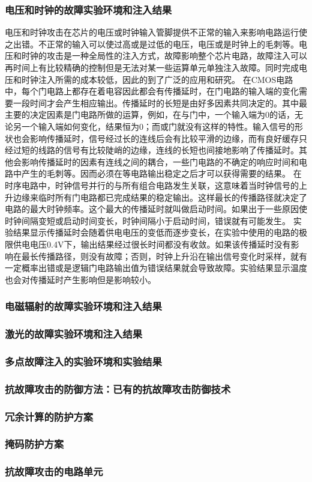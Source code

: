 \documentclass[a4paper,12pt]{article}
\begin{document}
\begin{CJK}{UTF8}{gkai}
\subsubsection{电压和时钟的故障实验环境和注入结果}

电压和时钟攻击在芯片的电压或时钟输入管脚提供不正常的输入来影响电路运行使之出错。不正常的输入可以使过高或是过低的电压，电压或是时钟上的毛刺等。电压和时钟的攻击是一种全局性的注入方式，故障影响整个芯片电路，故障注入可以再时间上有比较精确的控制但是无法对某一些运算单元单独注入故障。同时完成电压和时钟注入所需的成本较低，因此的到了广泛的应用和研究。
在CMOS电路中，每个门电路上都存在着电容因此都会有传播延时，在门电路的输入端的变化需要一段时间才会产生相应输出。传播延时的长短是由好多因素共同决定的。其中最主要的决定因素是门电路所做的运算，例如，在与门中，一个输入端为0的话，无论另一个输入端如何变化，结果恒为0；而或门就没有这样的特性。输入信号的形状也会影响传播延时，信号经过长的连线后会有比较平滑的边缘，而有良好缓存只经过短的线路的信号有比较陡峭的边缘，连线的长短也间接地影响了传播延时。其他会影响传播延时的因素有连线之间的耦合，一些门电路的不确定的响应时间和电路中产生的毛刺等。因而必须在等电路输出稳定之后才可以获得需要的结果。
在时序电路中，时钟信号并行的与所有组合电路发生关联，这意味着当时钟信号的上升边缘来临时所有门电路都已完成结果的稳定输出。这样最长的传播路径就决定了电路的最大时钟频率。这个最大的传播延时就叫做启动时间。如果出于一些原因使时钟间隔变短或启动时间变长，时钟间隔小于启动时间，错误就有可能发生。
实验结果显示传播延时会随着供电电压的变低而逐步变长，在实验中使用的电路的极限供电电压0.4V下，输出结果经过很长时间都没有收敛。如果该传播延时没有影响在最长传播路径，则没有故障；否则，时钟上升沿在输出信号变化时采样，就有一定概率出错或是逻辑门电路输出值为错误结果就会导致故障。实验结果显示温度也会对传播延时产生影响但是影响较小。

\subsubsection{电磁辐射的故障实验环境和注入结果}
\subsubsection{激光的故障实验环境和注入结果}
\subsubsection{多点故障注入的实验环境和实验结果}
\subsubsection{抗故障攻击的防御方法：已有的抗故障攻击防御技术}
\subsubsection{冗余计算的防护方案}
\subsubsection{掩码防护方案}
\subsubsection{抗故障攻击的电路单元}
\end{CJK}
\end{document}
